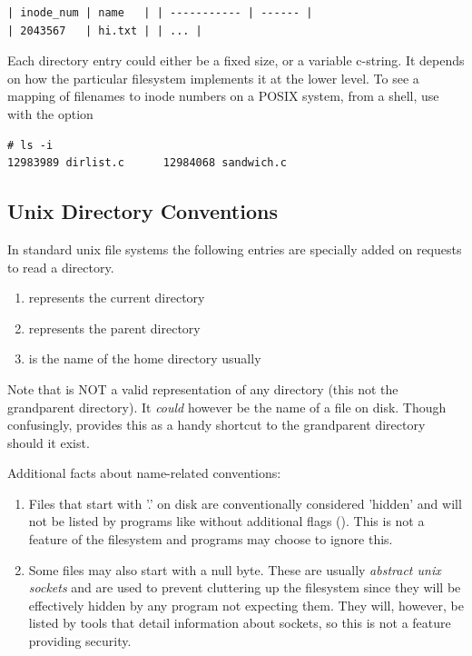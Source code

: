 \begin{lstlisting}
| inode_num | name   | | ----------- | ------ |
| 2043567   | hi.txt | | ... |
\end{lstlisting}

Each directory entry could either be a fixed size, or a variable c-string. It depends on how the particular filesystem implements it at the lower level. To see a mapping of filenames to inode numbers on a POSIX system, from a shell, use  with the  option

\begin{lstlisting}
# ls -i
12983989 dirlist.c      12984068 sandwich.c
\end{lstlisting}

\subsection{Unix Directory Conventions}

In standard unix file systems the following entries are specially added on requests to read a directory.

\begin{enumerate}
  \item {} represents the current directory
  \item {} represents the parent directory
  \item \keyword{\~} is the name of the home directory usually
\end{enumerate}

Note that  is NOT a valid representation of any directory (this not the grandparent directory). It \emph{could} however be the name of a file on disk. Though confusingly,  provides this as a handy shortcut to the grandparent directory should it exist.

Additional facts about name-related conventions:
\begin{enumerate}
  \item Files that start with '.' on disk are conventionally considered 'hidden' and will not be listed by programs like  without additional flags (). This is not a feature of the filesystem and programs may choose to ignore this.
  \item Some files may also start with a null byte. These are usually \emph{abstract unix sockets} and are used to prevent cluttering up the filesystem since they will be effectively hidden by any program not expecting them. They will, however, be listed by tools that detail information about sockets, so this is not a feature providing security.
\end{enumerate}

